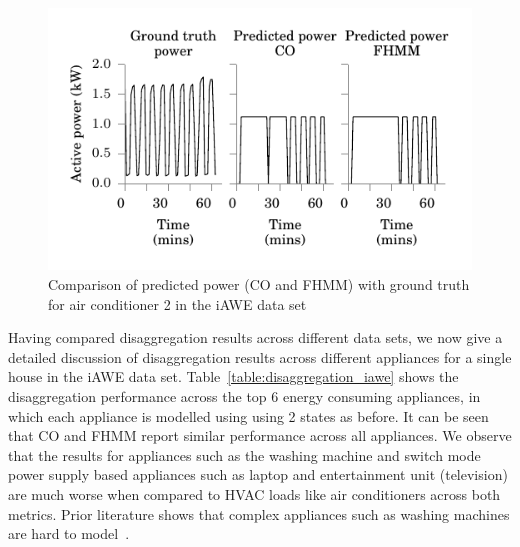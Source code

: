 \documentclass{sig-alternate}
\newcommand{\tabref}[1]{Table~\ref{#1}}
\begin{document}
\begin{figure}
\includegraphics{figures/ac_2.pdf} 
\caption{Comparison of predicted power (CO and FHMM) with ground truth for air conditioner 2 in the iAWE data set}
\label{fig:ac_disaggregation} 
\end{figure}

\noindent
Having compared disaggregation results across different data sets, we now give a detailed discussion of disaggregation results across different appliances for a single house in the iAWE data set. \tabref{table:disaggregation_iawe} shows the disaggregation performance across the top 6 energy consuming appliances, in which each appliance is modelled using using 2 states as before. It can be seen that CO and FHMM report similar performance across all appliances. We observe that the results for appliances such as the washing machine and switch mode power supply based appliances such as laptop and entertainment unit (television) are much worse when compared to HVAC loads like air conditioners across both metrics. Prior literature shows that complex appliances such as washing machines are hard to model~\cite{barker_2013}.
\end{document}
